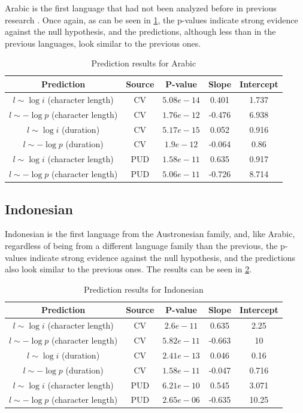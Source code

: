 Arabic is the first language that had not been analyzed before in previous research \cite{torre2019physical} \cite{hernandez2019linguistic}. Once again, as can be seen in \cref{tab:arabicresults}, the p-values indicate strong evidence against the null hypothesis, and the predictions, although less than in the previous languages, look similar to the previous ones.

\begin{table}[H]
    \centering
    \begin{tabular}{c|c|c|c|c}
        Prediction & Source & P-value & Slope & Intercept \\ \hline
        $l \sim \log i$ (character length) & CV & $5.08e-14$ & 0.401 & 1.737 \\
        $l \sim -\log p$ (character length) & CV & $1.76e-12$ & -0.476 & 6.938 \\
        $l \sim \log i$ (duration) & CV & $5.17e-15$ & 0.052 & 0.916 \\
        $l \sim -\log p$ (duration) & CV & $1.9e-12$ & -0.064 & 0.86 \\
        $l \sim \log i$ (character length) & PUD & $1.58e-11$ & 0.635 & 0.917 \\
        $l \sim -\log p$ (character length) & PUD & $5.06e-11$ & -0.726 & 8.714 \\
    \end{tabular}
    \caption{Prediction results for Arabic}
    \label{tab:arabicresults}
\end{table}

\subsection{Indonesian}

Indonesian is the first language from the Austronesian family, and, like Arabic, regardless of being from a different language family than the previous, the p-values indicate strong evidence against the null hypothesis, and the predictions also look similar to the previous ones. The results can be seen in \cref{tab:indonesianresults}.

\begin{table}[H]
    \centering
    \begin{tabular}{c|c|c|c|c}
        Prediction & Source & P-value & Slope & Intercept \\ \hline
        $l \sim \log i$ (character length) & CV & $2.6e-11$ & 0.635 & 2.25 \\
        $l \sim -\log p$ (character length) & CV & $5.82e-11$ & -0.663 & 10 \\
        $l \sim \log i$ (duration) & CV & $2.41e-13$ & 0.046 & 0.16 \\
        $l \sim -\log p$ (duration) & CV & $1.58e-11$ & -0.047 & 0.716 \\
        $l \sim \log i$ (character length) & PUD & $6.21e-10$ & 0.545 & 3.071 \\
        $l \sim -\log p$ (character length) & PUD & $2.65e-06$ & -0.635 & 10.25 \\
    \end{tabular}
    \caption{Prediction results for Indonesian}
    \label{tab:indonesianresults}
\end{table}

